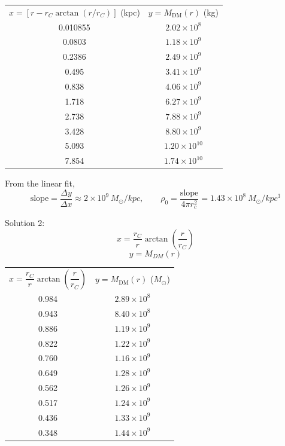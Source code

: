 \begin{description}
  \begin{center}
  \begin{tabular}{cc}
  $x = \left[r - r_C\arctan(r/r_C)\right]$ (kpc)
    & $y = M_{\mathrm{DM}}(r)$ (kg)\\
  0.010855 & $2.02\times 10^{8}$\\
  0.0803 & $1.18\times 10^{9}$\\
  0.2386 & $2.49\times 10^{9}$\\
  0.495 & $3.41\times 10^{9}$\\
  0.838 & $4.06\times 10^{9}$\\
  1.718 & $6.27\times 10^{9}$\\
  2.738 & $7.88\times 10^{9}$\\
  3.428 & $8.80\times 10^{9}$\\
  5.093 & $1.20\times 10^{10}$\\
  7.854 & $1.74\times 10^{10}$
  \end{tabular}
  \end{center}

  From the linear fit,
  \[ \text{slope} = \frac{\Delta y}{\Delta x} \approx
     2\times 10^{9}\,M_\odot/kpc,\qquad
     \rho_0 = \frac{\text{slope}}{4\pi r_c^2}
     = 1.43\times 10^{8}\ M_\odot/kpc^3 \]

  Solution 2:
  \[ x = \frac{r_C}{r}\arctan\left(\frac{r}{r_C}\right) \]
  \[ y = M_{DM}(r) \]

  \begin{center}
  \begin{tabular}{cc}
  $x = \dfrac{r_C}{r}\arctan\left(\dfrac{r}{r_C}\right)$
    & $y = M_{\mathrm{DM}}(r)$ ($M_\odot$)\\
  0.984 & $2.89\times 10^{8}$\\
  0.943 & $8.40\times 10^{8}$\\
  0.886 & $1.19\times 10^{9}$\\
  0.822 & $1.22\times 10^{9}$\\
  0.760 & $1.16\times 10^{9}$\\
  0.649 & $1.28\times 10^{9}$\\
  0.562 & $1.26\times 10^{9}$\\
  0.517 & $1.24\times 10^{9}$\\
  0.436 & $1.33\times 10^{9}$\\
  0.348 & $1.44\times 10^{9}$
  \end{tabular}
  \end{center}


\end{description}
